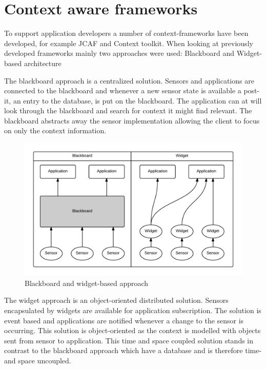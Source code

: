 \documentclass[../report.tex]{subfiles}
\begin{document}
\section{Context aware frameworks}
To support application developers a number of context-frameworks have been developed, for example JCAF and Context toolkit. When looking at previously developed frameworks mainly two approaches were used: Blackboard and Widget-based architecture \cite{Context-aware computing (2010)}

The blackboard approach is a centralized solution. Sensors and applications are connected to the blackboard and whenever a new sensor state is available a post-it, an entry to the database, is put on the blackboard. The application can at will look through the blackboard and search for context it might find relevant. The blackboard abstracts away the sensor implementation allowing the client to focus on only the context information. 

\begin{figure}
\centering
\includegraphics[width=\linewidth]{blackboard-widget.png}
\caption{Blackboard and widget-based approach}
\label{fig:blackboard-widget}
\end{figure}



The widget approach is an object-oriented distributed solution. Sensors encapsulated by widgets are available for application subscription. The solution is event based and applications are notified whenever a change to the sensor is occurring. This solution is object-oriented as the context is modelled with objects sent from sensor to application. This time and space coupled solution stands in contrast to the blackboard approach which have a database and is therefore time- and space uncoupled.
\end{document}
